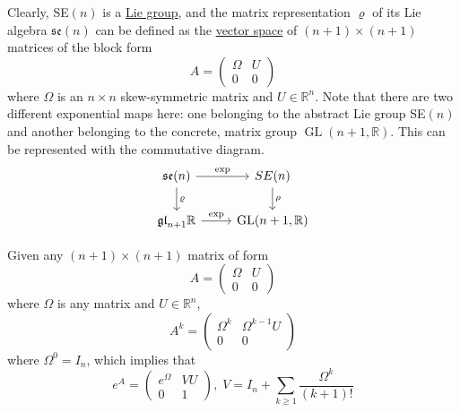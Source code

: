 \documentclass{article}
\DeclareMathOperator{\GL}{GL}
\begin{document}
    Clearly, SE$(n)$ is a \hyperref[def:lie-group]{Lie group}, and the matrix representation $\varrho$ of its Lie algebra $\mathfrak{se}(n)$ can be defined as the \hyperref[lin-def:vector-space]{vector space} of $(n+1) \times (n+1)$ matrices of the block form 
    \begin{equation}
      A = \begin{pmatrix}
      \Omega & U \\0 & 0
      \end{pmatrix}
    \end{equation}
    where $\Omega$ is an $n \times n$ skew-symmetric matrix and $U \in \mathbb{R}^n$. Note that there are two different exponential maps here: one belonging to the abstract Lie group SE$(n)$ and another belonging to the concrete, matrix group $\GL(n+1, \mathbb{R})$. This can be represented with the commutative diagram. 
    \begin{equation}
      \begin{tikzcd}
        \mathfrak{se}(n) \arrow{r}{\exp} \arrow{d}{\varrho} & SE(n) \arrow{d} {\rho}\\
        \mathfrak{gl}_{n+1} \mathbb{R} \arrow{r}{\exp} & \GL(n+1, \mathbb{R})
        \end{tikzcd}
    \end{equation}

    \begin{lemma}
      \label{thm:exponential-of-a-block-matrix}
      Given any $(n+1) \times (n+1)$ matrix of form 
      \begin{equation}
        A = \begin{pmatrix}
         \Omega & U \\0&0
        \end{pmatrix}
      \end{equation}
      where $\Omega$ is any matrix and $U \in \mathbb{R}^n$, 
      \begin{equation}
        A^k = \begin{pmatrix}
        \Omega^k & \Omega^{k-1} U \\0&0
        \end{pmatrix}
      \end{equation}
      where $\Omega^0 = I_n$, which implies that
      \begin{equation}
        e^A = \begin{pmatrix}
        e^\Omega & V U \\ 0 & 1
        \end{pmatrix}, \; V = I_n + \sum_{k \geq 1} \frac{\Omega^k}{(k+1)!}
      \end{equation}
    \end{lemma}
\end{document}
